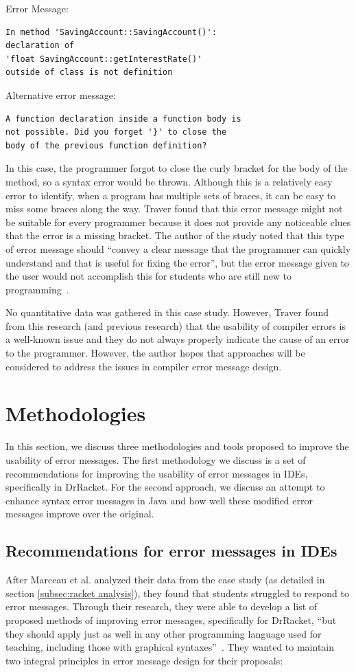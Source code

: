 \documentclass{sig-alternate}
\begin{document}
Error Message:
\begin{verbatim}
In method 'SavingAccount::SavingAccount()':
declaration of 
'float SavingAccount::getInterestRate()'
outside of class is not definition
\end{verbatim}

Alternative error message:
\begin{verbatim}
A function declaration inside a function body is 
not possible. Did you forget '}' to close the 
body of the previous function definition?
\end{verbatim}

In this case, the programmer forgot to close the curly bracket for the body of the method, so a syntax error would be thrown.
Although this is a relatively easy error to identify, when a program has multiple sets of braces, it can be easy to miss some braces along the way.
Traver found that this error message might not be suitable for every programmer because it does not provide any noticeable clues that the error is a missing bracket.
The author of the study noted that this type of error message should ``convey a clear message that the programmer can quickly understand and that is useful for fixing the error'', but the error message given to the user would not accomplish this for students who are still new to programming~\cite{Traver:2010}.

No quantitative data was gathered in this case study.
However, Traver found from this research (and previous research) that the usability of compiler errors is a well-known issue and they do not always properly indicate the cause of an error to the programmer.
However, the author hopes that approaches will be considered to address the issues in compiler error message design.


\section{Methodologies}\label{sec:methodologies}
In this section, we discuss three methodologies and tools proposed to improve the usability of error messages.
The first methodology we discuss is a set of recommendations for improving the usability of error messages in IDEs, specifically in DrRacket.
For the second approach, we discuss an attempt to enhance syntax error messages in Java and how well these modified error messages improve over the original. 

\subsection{Recommendations for error messages in IDEs}\label{subsec:error message rubric}
After Marceau et al. analyzed their data from the case study (as detailed in section \ref{subsec:racket analysis}), they found that students struggled to respond to error messages.
Through their research, they were able to develop a list of proposed methods of improving error messages, specifically for DrRacket, ``but they should apply just as well in any other programming language used for teaching, including those with graphical syntaxes''~\cite{Marceau:2011:MYL:2048237.2048241}.
They wanted to maintain two integral principles in error message design for their proposals:
\end{document}
